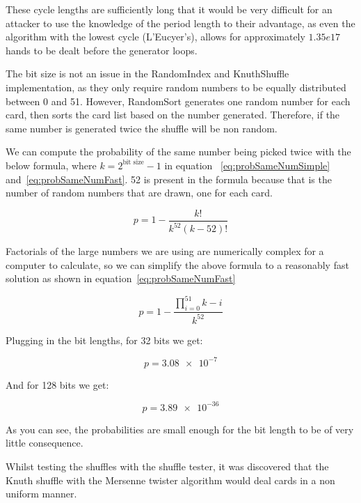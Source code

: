 These cycle lengths are sufficiently long that it would be very difficult
for an attacker to use the knowledge of the period length to their advantage,
as even the algorithm with the lowest cycle (L'Eucyer's), allows for
approximately $1.35e17$ hands to be dealt before the generator loops.

The bit size is not an issue in the RandomIndex and KnuthShuffle
implementation, as they only require random numbers to be equally distributed
between 0 and 51. However, RandomSort generates one random number for each
card, then sorts the card list based on the number generated. Therefore, if
the same number is generated twice the shuffle will be non random.

We can compute the probability of the same number being picked twice with the
below formula, where $k = 2^\text{bit size} - 1$ in equation 
~\ref{eq:probSameNumSimple} and~\ref{eq:probSameNumFast}. 52 is present in the
formula because that is the number of random numbers that are drawn, one for
each card.

\begin{equation} \label{eq:probSameNumSimple}
p = 1 - \frac{k!}{{k^{52}}(k - 52)!}
\end{equation}

Factorials of the large numbers we are using are numerically complex for a
computer to calculate, so we can simplify the above formula to a reasonably
fast solution as shown in equation~\ref{eq:probSameNumFast}

\begin{equation} \label{eq:probSameNumFast}
p = 1 - \frac{\displaystyle\prod_{i=0}^{51} k - i}{k^{52}}
\end{equation}

Plugging in the bit lengths, for 32 bits we get:

\begin{equation}
p = 3.08\num{e-7}
\end{equation}

And for 128 bits we get:

\begin{equation}
p = 3.89\num{e-36}
\end{equation}

As you can see, the probabilities are small enough for the bit length to be
of very little consequence.

Whilst testing the shuffles with the shuffle tester, it was discovered that
the Knuth shuffle with the Mersenne twister algorithm would deal cards in a
non uniform manner.


